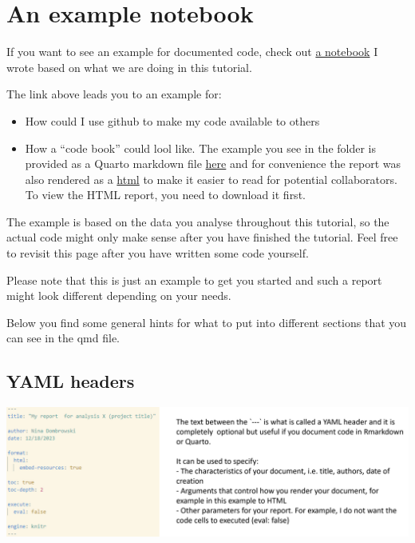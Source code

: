 \documentclass[
  letterpaper,
  DIV=11,
  numbers=noendperiod]{scrreprt}
\author{}
\date{}
\providecommand{\tightlist}{%
  \setlength{\itemsep}{0pt}\setlength{\parskip}{0pt}}\usepackage{longtable,booktabs,array}
\renewcommand*\contentsname{Table of contents}
\newcommand\contentsname{Table of contents}
\begin{document}

\renewcommand*\contentsname{Table of contents}
{
\hypersetup{linkcolor=}
\setcounter{tocdepth}{1}
\tableofcontents
}
\section{An example notebook}\label{an-example-notebook}

If you want to see an example for documented code, check out
\href{https://github.com/ndombrowski/cli_workshop/tree/main/example_doc}{a
notebook} I wrote based on what we are doing in this tutorial.

The link above leads you to an example for:

\begin{itemize}
\tightlist
\item
  How could I use github to make my code available to others
\item
  How a ``code book'' could lool like. The example you see in the folder
  is provided as a Quarto markdown file
  \href{https://github.com/ndombrowski/cli_workshop/blob/main/example_doc/example_notebook.qmd}{here}
  and for convenience the report was also rendered as a
  \href{https://github.com/ndombrowski/cli_workshop/blob/main/docs/example_doc/example_notebook.html}{html}
  to make it easier to read for potential collaborators. To view the
  HTML report, you need to download it first.
\end{itemize}

The example is based on the data you analyse throughout this tutorial,
so the actual code might only make sense after you have finished the
tutorial. Feel free to revisit this page after you have written some
code yourself.

Please note that this is just an example to get you started and such a
report might look different depending on your needs.

Below you find some general hints for what to put into different
sections that you can see in the qmd file.

\subsection{YAML headers}\label{yaml-headers}

\includegraphics[width=7.84375in,height=\textheight]{../img/yaml_header.png}
\end{document}

